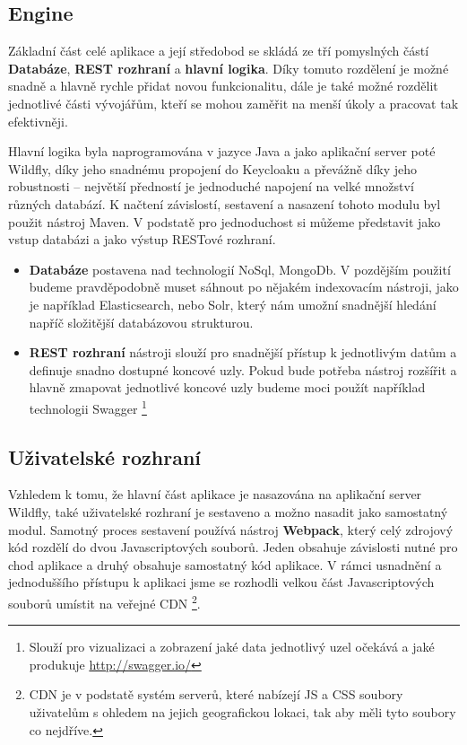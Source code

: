 \subsection{Engine}
\par Základní část celé aplikace a její středobod se skládá ze tří pomyslných částí \textbf{Databáze}, \textbf{REST rozhraní} a \textbf{hlavní logika}. Díky tomuto rozdělení je možné snadně a hlavně rychle přidat novou funkcionalitu, dále je také možné rozdělit jednotlivé části vývojářům, kteří se mohou zaměřit na menší úkoly a pracovat tak efektivněji.

\par Hlavní logika byla naprogramována v jazyce Java a jako aplikační server poté Wildfly, díky jeho snadnému propojení do Keycloaku a převážně díky jeho robustnosti -- největší předností je jednoduché napojení na velké množství různých databází. K načtení závislostí, sestavení a nasazení tohoto modulu byl použit nástroj Maven. V podstatě pro jednoduchost si můžeme představit jako vstup databázi a jako výstup RESTové rozhraní.

\begin{itemize}
\item \textbf{Databáze} postavena nad technologií NoSql, MongoDb. V pozdějším použití budeme pravděpodobně muset sáhnout po nějakém indexovacím nástroji, jako je například Elasticsearch, nebo Solr, který nám umožní snadnější hledání napříč složitější databázovou strukturou.
\item \textbf{REST rozhraní} nástroji slouží pro snadnější přístup k jednotlivým datům a definuje snadno dostupné koncové uzly. Pokud bude potřeba nástroj rozšířit a hlavně zmapovat jednotlivé koncové uzly budeme moci použít například technologii Swagger \footnote{Slouží pro vizualizaci a zobrazení jaké data jednotlivý uzel očekává a jaké produkuje \url{http://swagger.io/}}
\end{itemize}

\subsection{Uživatelské rozhraní}
\par Vzhledem k tomu, že hlavní část aplikace je nasazována na aplikační server Wildfly, také uživatelské rozhraní je sestaveno a možno nasadit jako samostatný modul. Samotný proces sestavení používá nástroj \textbf{Webpack}, který celý zdrojový kód rozdělí do dvou Javascriptových souborů. Jeden obsahuje závislosti nutné pro chod aplikace a druhý obsahuje samostatný kód aplikace. V rámci usnadnění a jednoduššího přístupu k aplikaci jsme se rozhodli velkou část Javascriptových souborů umístit na veřejné CDN \footnote{CDN je v podstatě systém serverů, které nabízejí JS a CSS soubory uživatelům s ohledem na jejich geografickou lokaci, tak aby měli tyto soubory co nejdříve.}.

